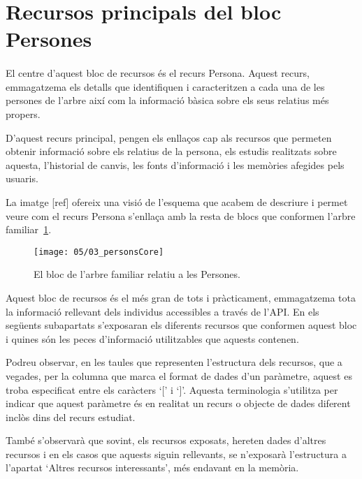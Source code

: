 \section{Recursos principals del bloc Persones}

    \paragraph{}
    El centre d'aquest bloc de recursos és el recurs Persona. Aquest recurs, emmagatzema els detalls que identifiquen i caracteritzen a cada una de les persones de l'arbre així com la informació bàsica sobre els seus relatius més propers.

    D'aquest recurs principal, pengen els enllaços cap als recursos que permeten obtenir informació sobre els relatius de la persona, els estudis realitzats sobre aquesta, l'historial de canvis, les fonts d'informació i les memòries afegides pels usuaris.

    La imatge [ref] ofereix una visió de l'esquema que acabem de descriure i permet veure com el recurs Persona s'enllaça amb la resta de blocs que conformen l'arbre familiar~\ref{img:personsBloc}.

    \begin{figure}[h]
        \texttt{[image: 05/03\_personsCore]}
        \centering
        \caption{El bloc de l'arbre familiar relatiu a les Persones.}\label{img:personsBloc}
    \end{figure}

    Aquest bloc de recursos és el més gran de tots i pràcticament, emmagatzema tota la informació rellevant dels individus accessibles a través de l'API. En els següents subapartats s'exposaran els diferents recursos que conformen aquest bloc i quines són les peces d'informació utilitzables que aquests contenen.

    Podreu observar, en les taules que representen l'estructura dels recursos, que a vegades, per la columna que marca el format de dades d'un paràmetre, aquest es troba especificat entre els caràcters `[' i `]'. Aquesta terminologia s'utilitza per indicar que aquest paràmetre és en realitat un recurs o objecte de dades diferent inclòs dins del recurs estudiat.

    També s'observarà que sovint, els recursos exposats, hereten dades d'altres recursos i en els casos que aquests siguin rellevants, se n'exposarà l'estructura a l'apartat `Altres recursos interessants', més endavant en la memòria.

    
    
    
    
    
    
    
    
    
